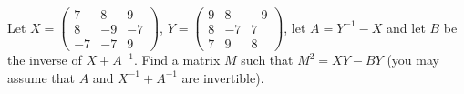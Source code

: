 Let $X = \begin{pmatrix}
            7 &  8 &  9 \\
            8 & -9 & -7 \\
           -7 & -7 &  9
         \end{pmatrix}$,
    $Y = \begin{pmatrix}
            9 &  8 & -9 \\
            8 & -7 &  7 \\
            7 &  9 &  8
         \end{pmatrix}$,
let $A = Y^{-1} - X$ and let $B$ be the inverse of $X + A^{-1}$. Find a matrix
$M$ such that $M^2 = XY - BY$ (you may assume that $A$ and $X^{-1} + A^{-1}$
are invertible).
